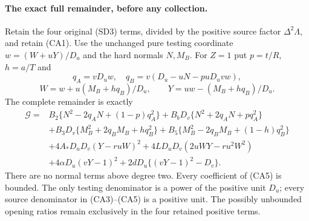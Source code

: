 \paragraph{The exact full remainder, before any collection.}
Retain the four original (SD3) terms, divided by the positive source
factor $\Delta^2\Lambda$, and retain (CA1). Use the unchanged pure
testing coordinate $w=(W+uY)/D_u$ and the hard normals $N,M_B$.
For $Z=1$ put $p=t/R$, $h=a/T$ and
\[
 q_A=vD_uw,\quad q_B=v(D_u-uN-puD_uv w),
\]
\[
 W=w+u(M_B+hq_B)/D_u,\qquad
 Y=uw-(M_B+hq_B)/D_u.
\]
The complete remainder is exactly
\begin{align*}
\mathscr G={}&B_2\{N^2-2q_AN+(1-p)q_A^2\}
 +B_bD_v\{N^2+2q_AN+pq_A^2\}\\
&+B_3D_v\{M_B^2+2q_BM_B+hq_B^2\}
 +B_5\{M_B^2-2q_BM_B+(1-h)q_B^2\}\\
&+4A_*D_uD_v(Y-r uW)^2
 +4LD_uD_v(2uWY-r u^2W^2)\\
&+4\alpha D_u(vY-1)^2
 +2dD_u\{(vY-1)^2-D_v\}.                         \tag{CA5}
\end{align*}
There are no normal terms above degree two. Every coefficient of
(CA5) is bounded. The only testing denominator is a power of the
positive unit $D_u$; every source denominator in (CA3)--(CA5) is a
positive unit. The possibly unbounded opening ratios remain exclusively
in the four retained positive terms.

